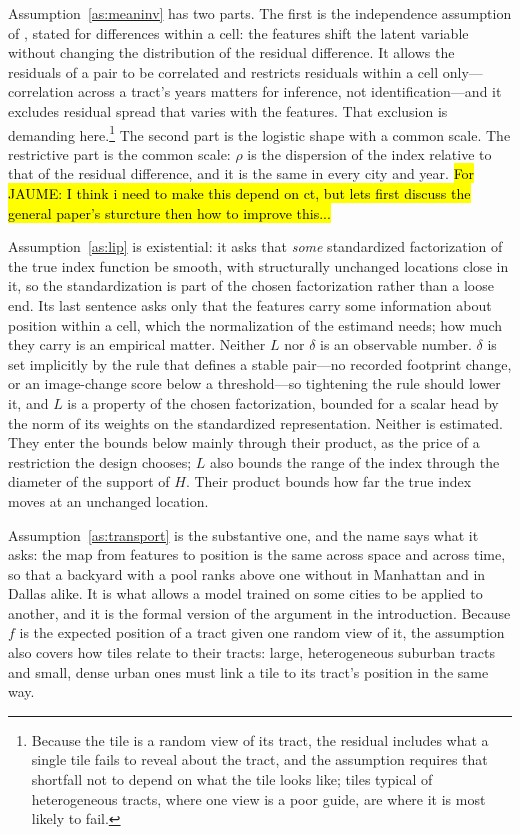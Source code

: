 \documentclass[11pt]{article}
\theoremstyle{remark}
\begin{document}
Assumption~\ref{as:meaninv} has two parts. The first is the independence assumption of
\citet{han1987}, stated for differences within a cell: the features shift the latent variable without
changing the distribution of the residual difference. It allows the residuals of a pair to be
correlated and restricts residuals within a cell
only---correlation across a tract's years matters for inference, not identification---and it excludes
residual spread that varies with the features. That exclusion is demanding here.\footnote{Because the tile is a
random view of its tract, the residual includes what a single tile fails to reveal about the tract, and
the assumption requires that shortfall not to depend on what the tile looks like; tiles typical of
heterogeneous tracts, where one view is a poor guide, are where it is most likely to fail.} The second part is the logistic shape with a common scale. The restrictive part is the common scale: $\rho$ is the dispersion of the index relative to that
of the residual difference, and it is the same in every city and year. \hl{For JAUME: I think i need to make this depend on ct, but lets first discuss the general paper's sturcture then how to improve this...}

Assumption~\ref{as:lip} is existential: it asks that \emph{some} standardized factorization of the true
index function be smooth, with structurally unchanged locations close in it, so the standardization is
part of the chosen factorization rather than a loose end. Its last sentence asks only that the features
carry some information about position within a cell, which the normalization of the estimand needs; how
much they carry is an empirical matter. Neither $L$ nor $\delta$ is an observable number. $\delta$ is
set implicitly by the rule that defines a stable pair---no recorded footprint change, or an image-change
score below a threshold---so tightening the rule should lower it, and $L$ is a property of the chosen
factorization, bounded for a scalar head by the norm of its weights on the standardized representation.
Neither is estimated. They enter the bounds below mainly through their product, as the price of a
restriction the design chooses; $L$ also bounds the range of the index through the diameter of the
support of $H$. Their product bounds how far the true index moves at an unchanged location.

Assumption~\ref{as:transport} is the substantive one, and the name says what it asks: the map from
features to position is the same across space and across time, so that a backyard with a pool ranks
above one without in Manhattan and in Dallas alike. It is what allows a model trained on some cities to
be applied to another, and it is the formal version of the argument in the introduction. Because $f$
is the expected position of a tract given one random view of it, the assumption also covers how tiles
relate to their tracts: large, heterogeneous suburban tracts and small, dense urban ones must link a
tile to its tract's position in the same way.
\end{document}
